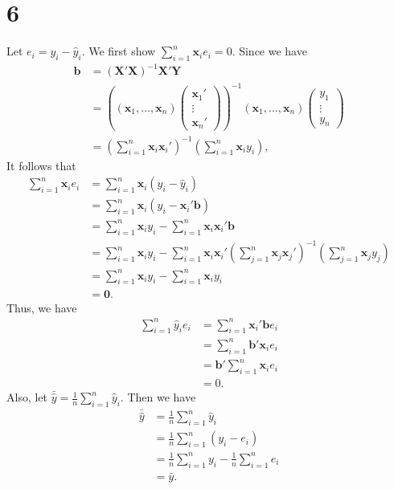 \documentclass[a4paper,11pt]{article}
\begin{document}
\section*{6}
Let $e_i=y_i-\hat{y}_i$. We first show $\sum_{i=1}^n\bm{x}_ie_i=0$. Since we have 
\begin{align*}
    \bm{b}&=(\bm{X}'\bm{X})^{-1}\bm{X}'\bm{Y}\\
    &=\left((\bm{x}_1,\dots,\bm{x}_n)\begin{pmatrix}\bm{x}_1'\\\vdots\\\bm{x}_n'\end{pmatrix}\right)^{-1}(\bm{x}_1,\dots,\bm{x}_n)\begin{pmatrix}y_1\\\vdots\\y_n\end{pmatrix}\\
    &=\left(\sum_{i=1}^n\bm{x}_i\bm{x}_i'\right)^{-1}\left(\sum_{i=1}^n\bm{x}_i y_i\right),
\end{align*}
It follows that 
\begin{align*}
    \sum_{i=1}^n\bm{x}_ie_i&=\sum_{i=1}^n\bm{x}_i(y_i-\hat{y}_i)\\
    &=\sum_{i=1}^n\bm{x}_i\left(y_i-\bm{x}_i'\bm{b}\right)\\
    &=\sum_{i=1}^n\bm{x}_i y_i-\sum_{i=1}^n\bm{x}_i\bm{x}_i'\bm{b}\\
    &=\sum_{i=1}^n\bm{x}_i y_i-\sum_{i=1}^n\bm{x}_i\bm{x}_i'\left(\sum_{j=1}^n\bm{x}_j\bm{x}_j'\right)^{-1}\left(\sum_{j=1}^n\bm{x}_j y_j\right)\\
    &=\sum_{i=1}^n\bm{x}_i y_i-\sum_{i=1}^n\bm{x}_i y_i\\
    &=\bm{0}.
\end{align*}
Thus, we have 
\begin{align*}
    \sum_{i=1}^n\hat{y}_ie_i&=\sum_{i=1}^n\bm{x}_i'\bm{b}e_i\\
    &=\sum_{i=1}^n\bm{b}'\bm{x}_ie_i\\
    &=\bm{b}'\sum_{i=1}^n\bm{x}_ie_i\\
    &=0.
\end{align*}
Also, let $\bar{\hat{y}}=\frac{1}{n}\sum_{i=1}^n\hat{y}_i$. Then we have
\begin{align*}
    \bar{\hat{y}}&=\frac{1}{n}\sum_{i=1}^n\hat{y}_i\\
    &=\frac{1}{n}\sum_{i=1}^n(y_i-e_i)\\
    &=\frac{1}{n}\sum_{i=1}^ny_i-\frac{1}{n}\sum_{i=1}^ne_i\\
    &=\bar{y}.
\end{align*}
\end{document}
